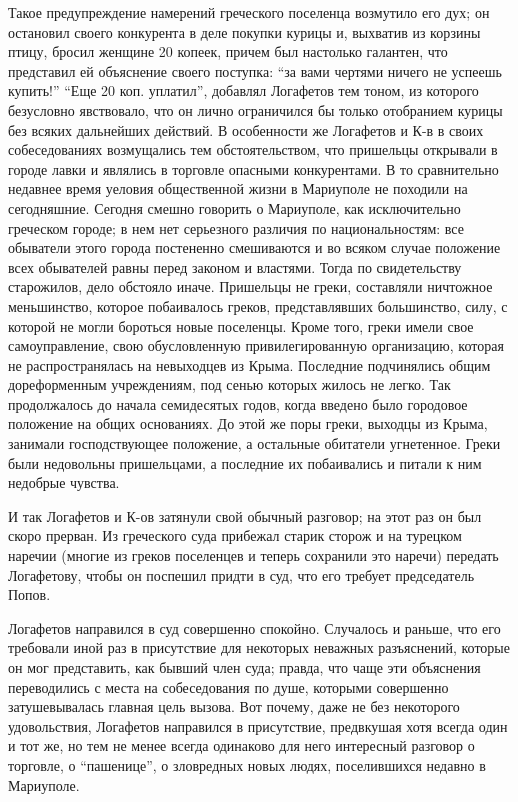 \documentclass[a4paper,20pt]{report}
\begin{document}
Такое предупреждение намерений греческого поселенца возмутило его дух; он остановил своего конкурента в деле покупки курицы
и, выхватив из корзины птицу, бросил женщине 20 копеек, причем был настолько галантен, что представил ей объяснение своего поступка:
``за вами чертями ничего не успеешь купить!''
``Еще 20 коп. уплатил'', добавлял Логафетов тем тоном, из которого 
безусловно явствовало, что он лично ограничился бы только отобранием
курицы без всяких дальнейших действий. В особенности
же Логафетов и К-в в своих собеседованиях возмущались тем обстоятельством, 
что пришельцы открывали в
городе лавки и являлись в торговле опасными конкурентами. В то сравнительно
недавнее время уеловия общественной жизни в Мариуполе не походили на сегодняшние.
Сегодня смешно говорить о Мариуполе, как исключительно греческом городе; в нем
нет серьезного различия по национальностям: все обыватели этого города
постененно смешиваются и во всяком случае положение всех обывателей равны перед
законом и властями. Тогда по свидетельству старожилов, дело обстояло иначе.
Пришельцы не греки, составляли ничтожное меньшинство, которое побаивалось
греков, представлявших большинство, силу, с которой не могли бороться новые
поселенцы. Кроме того, греки имели свое самоуправление, свою обусловленную
привилегированную организацию, которая не распространялась на невыходцев из
Крыма. Последние подчинялись общим дореформенным учреждениям, под сенью которых
жилось не легко. Так продолжалось до начала семидесятых годов, когда введено
было городовое положение на общих основаниях. До этой же поры греки, выходцы из
Крыма, занимали господствующее положение, а остальные обитатели угнетенное.
Греки были недовольны пришельцами, а последние их побаивались и питали к ним
недобрые чувства.

И так Логафетов и К-ов затянули свой обычный разговор; на этот раз он был скоро
прерван. Из греческого суда прибежал старик сторож и на турецком наречии
(многие из греков поселенцев и теперь сохранили это наречи) передать
Логафетову, чтобы он поспешил придти в суд, что его требует председатель Попов.

Логафетов направился в суд совершенно спокойно.
Случалось и раньше, что его требовали иной раз в присутствие
для некоторых неважных разъяснений, которые он мог представить, как бывший член суда;
правда, что чаще эти объяснения переводились с места на собеседования по душе, которыми совершенно
затушевывалась главная цель вызова. Вот почему, даже не без некоторого удовольствия, Логафетов направился 
в присутствие, предвкушая хотя всегда один и тот же, но тем не менее всегда
одинаково для него интересный разговор о торговле, о ``пашенице'', о зловредных
новых людях, поселившихся недавно в Мариуполе.
\end{document}
